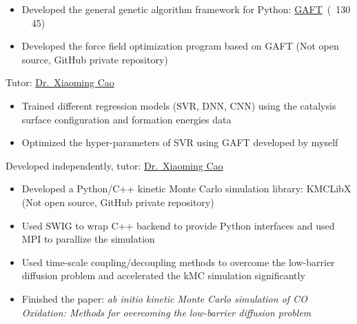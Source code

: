 \documentclass{resume}
\begin{document}
\begin{onehalfspacing}
\begin{itemize}
    \item Developed the general genetic algorithm framework for Python: \faLink \href{https://github.com/PytLab/gaft}{GAFT}\ (\faStar\ 130 \ \faCodeFork\ 45)
  \item Developed the force field optimization program based on GAFT (Not open source, GitHub private repository)
\end{itemize}
\end{onehalfspacing}

 {Tutor: \faLink \href{http://chem.ecust.edu.cn/2014/1211/c6655a50467/page.htm}{Dr.\ Xiaoming Cao}}
\begin{onehalfspacing}
\begin{itemize}
    \item Trained different regression models (SVR, DNN, CNN) using the catalysis surface configuration and formation energies data
    \item Optimized the hyper-parameters of SVR using GAFT developed by myself
\end{itemize}
\end{onehalfspacing}

 {Developed independently, tutor: \faLink \href{http://chem.ecust.edu.cn/2014/1211/c6655a50467/page.htm}{Dr.\ Xiaoming Cao}}
\begin{onehalfspacing}
\begin{itemize}
    \item Developed a Python/C++ kinetic Monte Carlo simulation library: KMCLibX (Not open source, GitHub private repository)
    \item Used SWIG to wrap C++ backend to provide Python interfaces and used MPI to parallize the simulation
    \item Used time-scale coupling/decoupling methods to overcome the low-barrier diffusion problem and accelerated the kMC simulation significantly
    \item Finished the paper: \emph{ab initio kinetic Monte Carlo simulation of CO Oxidation: Methods for overcoming the low-barrier diffusion problem}
\end{itemize}
\end{onehalfspacing}
\end{document}
